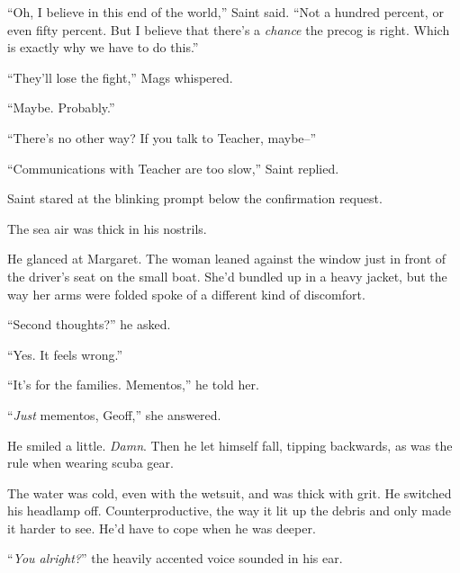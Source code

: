 ``Oh, I believe in this end of the world,'' Saint said.  ``Not a hundred percent, or even fifty percent.  But I believe that there's a \emph{chance} the precog is right.  Which is exactly why we have to do this.''



``They'll lose the fight,'' Mags whispered.



``Maybe.  Probably.''



``There's no other way?  If you talk to Teacher, maybe--''



``Communications with Teacher are too slow,'' Saint replied.



Saint stared at the blinking prompt below the confirmation request.



\sectionbreak



The sea air was thick in his nostrils.



He glanced at Margaret.  The woman leaned against the window just in front of the driver's seat on the small boat.  She'd bundled up in a heavy jacket, but the way her arms were folded spoke of a different kind of discomfort.



``Second thoughts?'' he asked.



``Yes.  It feels wrong.''



``It's for the families.  Mementos,'' he told her.



``\emph{Just} mementos, Geoff,'' she answered.



He smiled a little.  \emph{Damn}.  Then he let himself fall, tipping backwards, as was the rule when wearing scuba gear.



The water was cold, even with the wetsuit, and was thick with grit.  He switched his headlamp off.  Counterproductive, the way it lit up the debris and only made it harder to see.  He'd have to cope when he was deeper.



``\emph{You alright?}'' the heavily accented voice sounded in his ear.




